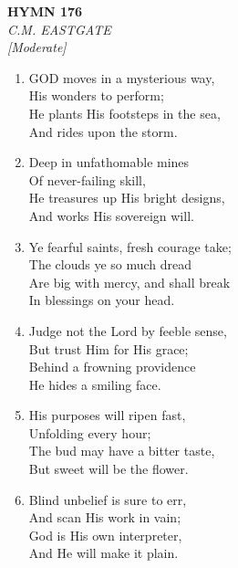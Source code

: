 \newpage
\begin{center}
    {\Large \textbf{HYMN 176}}
    \\
    \textit{C.M. EASTGATE}
    \\
    \textit{\small [Moderate]}
\end{center}
\vspace{1em}

\begin{enumerate}
    \item GOD moves in a mysterious way, \\
        His wonders to perform; \\
        He plants His footsteps in the sea, \\
        And rides upon the storm.

    \item Deep in unfathomable mines \\
        Of never-failing skill, \\
        He treasures up His bright designs, \\
        And works His sovereign will.

    \item Ye fearful saints, fresh courage take; \\
        The clouds ye so much dread \\
        Are big with mercy, and shall break \\
        In blessings on your head.

    \item Judge not the Lord by feeble sense, \\
        But trust Him for His grace; \\
        Behind a frowning providence \\
        He hides a smiling face.

    \item His purposes will ripen fast, \\
        Unfolding every hour; \\
        The bud may have a bitter taste, \\
        But sweet will be the flower.

    \item Blind unbelief is sure to err, \\
        And scan His work in vain; \\
        God is His own interpreter, \\
        And He will make it plain.

\end{enumerate}

